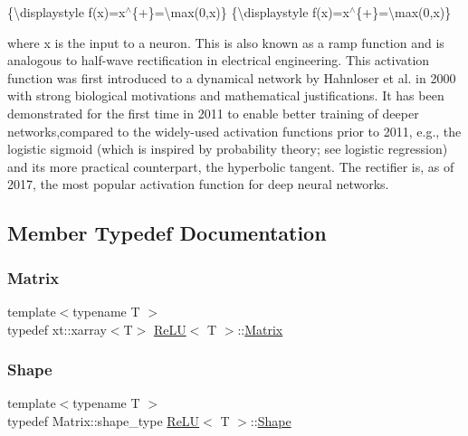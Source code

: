 \{\textbackslash{}displaystyle f(x)=x$^\wedge$\{+\}=\textbackslash{}max(0,x)\} \{\textbackslash{}displaystyle f(x)=x$^\wedge$\{+\}=\textbackslash{}max(0,x)\}

where x is the input to a neuron. This is also known as a ramp function and is analogous to half-\/wave rectification in electrical engineering. This activation function was first introduced to a dynamical network by Hahnloser et al. in 2000 with strong biological motivations and mathematical justifications. It has been demonstrated for the first time in 2011 to enable better training of deeper networks,compared to the widely-\/used activation functions prior to 2011, e.\+g., the logistic sigmoid (which is inspired by probability theory; see logistic regression) and its more practical counterpart, the hyperbolic tangent. The rectifier is, as of 2017, the most popular activation function for deep neural networks. 

\subsection{Member Typedef Documentation}
\mbox{\label{class_re_l_u_a3d1448f06335a4ab7227ec31a43a410f}} 
\subsubsection{\texorpdfstring{Matrix}{Matrix}}
{\footnotesize\ttfamily template$<$typename T $>$ \\
typedef xt\+::xarray$<$T$>$ \mbox{\hyperlink{class_re_l_u}{Re\+LU}}$<$ T $>$\+::\mbox{\hyperlink{class_re_l_u_a3d1448f06335a4ab7227ec31a43a410f}{Matrix}}}

\mbox{\label{class_re_l_u_ae27e6aba0a09baa85b8ef8679db42719}} 
\subsubsection{\texorpdfstring{Shape}{Shape}}
{\footnotesize\ttfamily template$<$typename T $>$ \\
typedef Matrix\+::shape\+\_\+type \mbox{\hyperlink{class_re_l_u}{Re\+LU}}$<$ T $>$\+::\mbox{\hyperlink{class_re_l_u_ae27e6aba0a09baa85b8ef8679db42719}{Shape}}}



